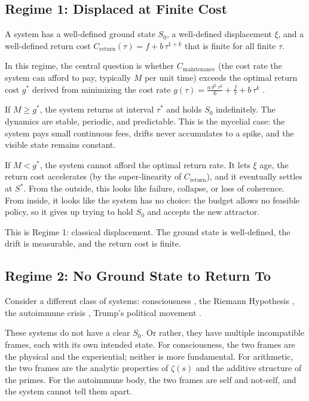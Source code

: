 \documentclass[12pt]{article}
\theoremstyle{definition}
\theoremstyle{remark}
\begin{document}
\subsection{Regime 1: Displaced at Finite Cost}

A system has a well-defined ground state $S_0$, a well-defined displacement $\xi$, and a well-defined return cost $C_{\text{return}}(\tau)=f+b\,\tau^{1+k}$ that is finite for all finite $\tau$.

In this regime, the central question is whether $C_{\text{maintenance}}$ (the cost rate the system can afford to pay, typically $M$ per unit time) exceeds the optimal return cost $g^*$ derived from minimizing the cost rate $g(\tau)=\frac{a\,\delta^2\,\tau^2}{6}+\frac{f}{\tau}+b\,\tau^k$ \cite{maintenance}.

If $M\ge g^*$, the system returns at interval $\tau^*$ and holds $S_0$ indefinitely. The dynamics are stable, periodic, and predictable. This is the mycelial case: the system pays small continuous fees, drifts never accumulates to a spike, and the visible state remains constant.

If $M<g^*$, the system cannot afford the optimal return rate. It lets $\xi$ age, the return cost accelerates (by the super-linearity of $C_{\text{return}}$), and it eventually settles at $S^*$. From the outside, this looks like failure, collapse, or loss of coherence. From inside, it looks like the system has no choice: the budget allows no feasible policy, so it gives up trying to hold $S_0$ and accepts the new attractor.

This is Regime 1: classical displacement. The ground state is well-defined, the drift is measurable, and the return cost is finite.

\subsection{Regime 2: No Ground State to Return To}

Consider a different class of systems: consciousness \cite{consciousness}, the Riemann Hypothesis \cite{resonance}, the autoimmune crisis \cite{five}, Trump's political movement \cite{versus}.

These systems do not have a clear $S_0$. Or rather, they have multiple incompatible frames, each with its own intended state. For consciousness, the two frames are the physical and the experiential; neither is more fundamental. For arithmetic, the two frames are the analytic properties of $\zeta(s)$ and the additive structure of the primes. For the autoimmune body, the two frames are self and not-self, and the system cannot tell them apart.
\end{document}
